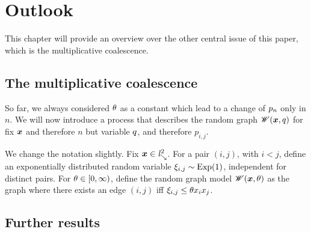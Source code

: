 
\chapter{Outlook} \label{C: outlook}

This chapter will provide an overview over the other central issue of this paper,
which is the multiplicative coalescence.

\section{The multiplicative coalescence}

So far, we always considered $\theta$ as a constant which lead to a change of $p_n$ only in $n$.
We will now introduce a process that describes the random graph $\mathscr{W}(\boldsymbol{x}, q)$ for fix $\boldsymbol{x}$ and therefore $n$
but variable $q$, and therefore $p_{i,j}$.

We change the notation slightly.
Fix $\boldsymbol{x} \in \mathit{l}^2_{\searrow}$.
For a pair $(i,j)$, with $i < j$, 
define an exponentially distributed random variable $\xi_{i,j} \sim \operatorname*{Exp}(1)$,
independent for distinct pairs.
For $\theta \in [0, \infty)$, define the random graph model $\mathscr{W}(\boldsymbol{x}, \theta)$ as the graph where there exists an edge $(i,j)$ 
iff $\xi_{i,j} \leq \theta x_i x_j$.




\section{Further results}
